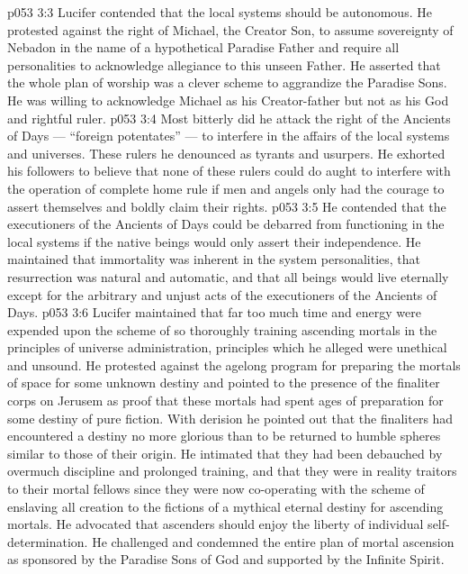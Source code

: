 \vs p053 3:3 \bibnobreakspace {} Lucifer contended that the local systems should be autonomous. He protested against the right of Michael, the Creator Son, to assume sovereignty of Nebadon in the name of a hypothetical Paradise Father and require all personalities to acknowledge allegiance to this unseen Father. He asserted that the whole plan of worship was a clever scheme to aggrandize the Paradise Sons. He was willing to acknowledge Michael as his Creator\hyp{}father but not as his God and rightful ruler.
\vs p053 3:4 Most bitterly did he attack the right of the Ancients of Days --- “foreign potentates” --- to interfere in the affairs of the local systems and universes. These rulers he denounced as tyrants and usurpers. He exhorted his followers to believe that none of these rulers could do aught to interfere with the operation of complete home rule if men and angels only had the courage to assert themselves and boldly claim their rights.
\vs p053 3:5 He contended that the executioners of the Ancients of Days could be debarred from functioning in the local systems if the native beings would only assert their independence. He maintained that immortality was inherent in the system personalities, that resurrection was natural and automatic, and that all beings would live eternally except for the arbitrary and unjust acts of the executioners of the Ancients of Days.
\vs p053 3:6 \bibnobreakspace {} Lucifer maintained that far too much time and energy were expended upon the scheme of so thoroughly training ascending mortals in the principles of universe administration, principles which he alleged were unethical and unsound. He protested against the agelong program for preparing the mortals of space for some unknown destiny and pointed to the presence of the finaliter corps on Jerusem as proof that these mortals had spent ages of preparation for some destiny of pure fiction. With derision he pointed out that the finaliters had encountered a destiny no more glorious than to be returned to humble spheres similar to those of their origin. He intimated that they had been debauched by overmuch discipline and prolonged training, and that they were in reality traitors to their mortal fellows since they were now co\hyp{}operating with the scheme of enslaving all creation to the fictions of a mythical eternal destiny for ascending mortals. He advocated that ascenders should enjoy the liberty of individual self\hyp{}determination. He challenged and condemned the entire plan of mortal ascension as sponsored by the Paradise Sons of God and supported by the Infinite Spirit.
